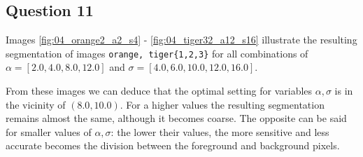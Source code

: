 \noindent{}


\subsection{Question 11}

Images \ref{fig:04_orange2_a2_s4} - \ref{fig:04_tiger32_a12_s16} illustrate
the resulting segmentation of images \texttt{orange, tiger\{1,2,3\}} for
all combinations of \texttt{$\alpha = [2.0, 4.0, 8.0, 12.0]$} and
\texttt{$\sigma = [4.0, 6.0, 10.0, 12.0, 16.0]$}.

From these images we can deduce that the optimal setting for variables
\texttt{$\alpha, \sigma$} is in the vicinity of $(8.0, 10.0)$. For a higher
values the resulting segmentation remains almost the same, although it becomes
coarse. The opposite can be said for smaller values of \texttt{$\alpha, \sigma$}:
the lower their values, the more sensitive and less accurate becomes the
division between the foreground and background pixels.


